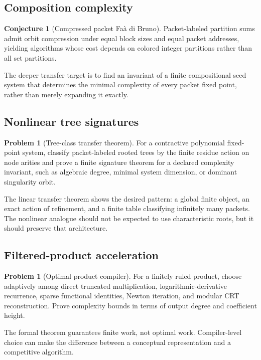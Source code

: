 \documentclass[11pt]{article}
\theoremstyle{definition}\newtheorem{definition}[theorem]{Definition}\newtheorem{example}[theorem]{Example}\newtheorem{construction}[theorem]{Construction}\newtheorem{algorithm}[theorem]{Algorithm}\newtheorem{conjecture}[theorem]{Conjecture}\newtheorem{problem}[theorem]{Problem}
\theoremstyle{remark}\newtheorem{remark}[theorem]{Remark}\newtheorem{boundary}[theorem]{Boundary}\newtheorem{certificate}[theorem]{Computational Certificate}\newtheorem{classical}[theorem]{Classical Input}\newtheorem{principle}[theorem]{Structural Principle}
\begin{document}
\subsection{Composition complexity}
\begin{conjecture}[Compressed packet Fa\`a di Bruno]
Packet-labeled partition sums admit orbit compression under equal block sizes and equal packet addresses, yielding algorithms whose cost depends on colored integer partitions rather than all set partitions.
\end{conjecture}

The deeper transfer target is to find an invariant of a finite compositional seed system that determines the minimal complexity of every packet fixed point, rather than merely expanding it exactly.

\subsection{Nonlinear tree signatures}
\begin{problem}[Tree-class transfer theorem]
For a contractive polynomial fixed-point system, classify packet-labeled rooted trees by the finite residue action on node arities and prove a finite signature theorem for a declared complexity invariant, such as algebraic degree, minimal system dimension, or dominant singularity orbit.
\end{problem}

The linear transfer theorem shows the desired pattern: a global finite object, an exact action of refinement, and a finite table classifying infinitely many packets.  The nonlinear analogue should not be expected to use characteristic roots, but it should preserve that architecture.

\subsection{Filtered-product acceleration}
\begin{problem}[Optimal product compiler]
For a finitely ruled product, choose adaptively among direct truncated multiplication, logarithmic-derivative recurrence, sparse functional identities, Newton iteration, and modular CRT reconstruction.  Prove complexity bounds in terms of output degree and coefficient height.
\end{problem}

The formal theorem guarantees finite work, not optimal work.  Compiler-level choice can make the difference between a conceptual representation and a competitive algorithm.
\end{document}
